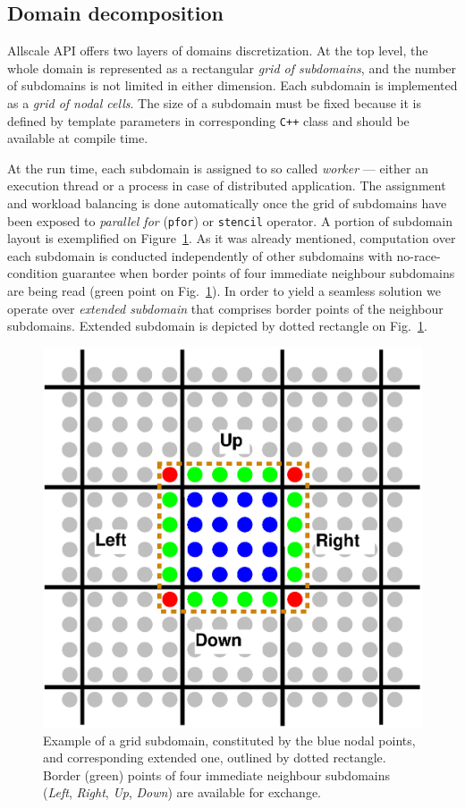 \documentclass[conference,compsoc]{IEEEtran}
\begin{document}
\subsection{Domain decomposition}

Allscale API offers two layers of domains discretization. At the top level, the whole domain is represented as a rectangular \textit{grid of subdomains}, and the number of subdomains is not limited in either dimension. Each subdomain is implemented as a \textit{grid of nodal cells}. The size of a subdomain must be fixed because it is defined by template parameters in corresponding \texttt{C++} class and should be available at compile time.

At the run time, each subdomain is assigned to so called \textit{worker} --- either an execution thread or a process in case of distributed application. The assignment and workload balancing is done automatically once the grid of subdomains have been exposed to \textit{parallel for} (\texttt{pfor}) or \texttt{stencil} operator. A portion of subdomain layout is exemplified on Figure~\ref{fig:cell}. As it was already mentioned, computation over each subdomain is conducted independently of other subdomains with no-race-condition guarantee when border points of four immediate neighbour subdomains are being read (green point on Fig.~\ref{fig:cell}). In order to yield a seamless solution we operate over \textit{extended subdomain} that comprises border points of the neighbour subdomains. Extended subdomain is depicted by dotted rectangle on Fig.~\ref{fig:cell}. 

\begin{figure}[!htb]
\includegraphics[scale=0.6]{images/subdomain}
\caption{Example of a grid subdomain, constituted by the blue nodal points, and corresponding extended one, outlined by dotted rectangle. Border (green) points of four immediate neighbour subdomains (\textit{Left}, \textit{Right}, \textit{Up}, \textit{Down}) are available for exchange.}
\label{fig:cell}
\end{figure}
\end{document}
